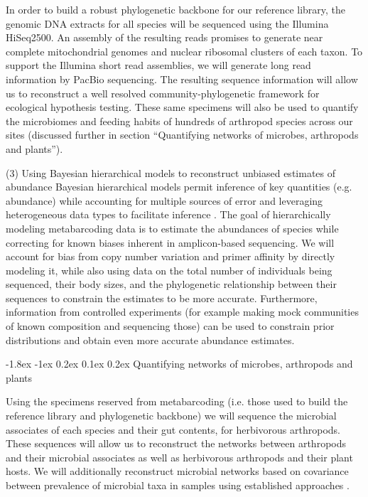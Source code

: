 \documentclass[11pt]{article}
\makeatletter
\renewcommand\subsection{\@startsection{subsection}{1}{\z@}%
                                  {-1.8ex \@plus -1ex \@minus 0.2ex}%
                                  {0.1ex \@plus 0.2ex}%
                                  {\normalfont\large\bfseries}}
\renewcommand{\paragraph}{\@startsection{paragraph}{4}{\z@}
  {1ex \@plus 1ex \@minus .2ex}{-1em}
  {\normalfont\normalsize\it}
}
\makeatother
\begin{document}
In order to build a robust phylogenetic backbone for our reference
library, the genomic DNA extracts for all species will be sequenced
using the Illumina HiSeq2500. An assembly of the resulting reads
promises to generate near complete mitochondrial genomes and nuclear
ribosomal clusters of each taxon. To support the Illumina short read
assemblies, we will generate long read information by PacBio
sequencing. The resulting sequence information will allow us to
reconstruct a well resolved community-phylogenetic framework for
ecological hypothesis testing.  These same specimens will also be used
to quantify the microbiomes and feeding habits of hundreds of
arthropod species across our sites (discussed further in section
``Quantifying networks of microbes, arthropods and plants'').

\paragraph{(3) Using Bayesian hierarchical models to reconstruct
  unbiased estimates of abundance}
Bayesian hierarchical models permit inference of key quantities
(e.g. abundance) while accounting for multiple sources of error and
leveraging heterogeneous data types to facilitate inference
\citep{royleDorazio}.  The goal of hierarchically modeling
metabarcoding data is to estimate the abundances of species while
correcting for known biases inherent in amplicon-based sequencing.  We
will account for bias from copy number variation and primer affinity
\citep{elbrecht2015} by directly modeling it, while also using data on
the total number of individuals being sequenced, their body sizes, and
the phylogenetic relationship between their sequences to constrain the
estimates to be more accurate.  Furthermore, information from
controlled experiments (for example making mock communities of known
composition and sequencing those) can be used to constrain prior
distributions and obtain even more accurate abundance estimates.


\subsection{Quantifying networks of microbes, arthropods and plants}

Using the specimens reserved from metabarcoding (i.e. those used to
build the reference library and phylogenetic backbone) we will
sequence the microbial associates of each species and their gut
contents, for herbivorous arthropods.  These sequences will allow us
to reconstruct the networks between arthropods and their microbial
associates as well as herbivorous arthropods and their plant hosts.
We will additionally reconstruct microbial networks based on
covariance between prevalence of microbial taxa in samples using
established approaches \citep{kurtz2015}.
\end{document}

